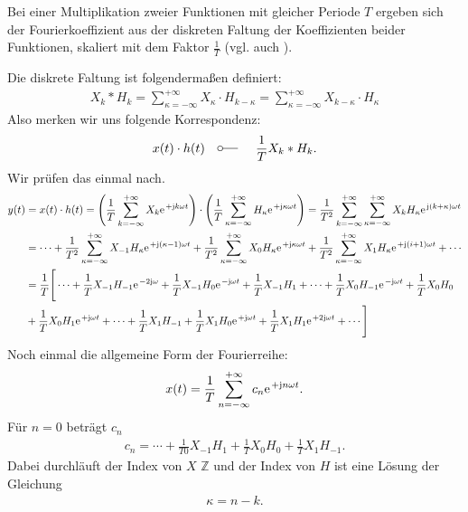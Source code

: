 \documentclass[11pt,a4paper,DIV=12]{scrartcl}
\begin{document}
%
%
%
Bei einer Multiplikation zweier Funktionen mit gleicher Periode $T$ ergeben sich
der Fourierkoeffizient aus der diskreten Faltung der Koeffizienten beider
Funktionen, skaliert mit dem Faktor $\frac{1}{T}$ (vgl. auch \cite[Kap. 3, S. 208]{Oppenheim1997}).

Die diskrete Faltung ist folgendermaßen definiert:
\begin{align}
	X_k\ast H_k=\sum_{\kappa = -\infty}^{+\infty}X_{\kappa}\cdot H_{k-\kappa}=\sum_{\kappa =-\infty}^{+\infty}X_{k-\kappa}\cdot H_{\kappa }
\end{align}
%
Also merken wir uns folgende Korrespondenz:
%
\begin{align}
	x(t)\cdot h(t)\quad\fourier\quad \frac{1}{T}X_k \ast H_k.
\end{align}
%
Wir prüfen das einmal nach.
%
%
\begin{align}
	y(t)&=x(t)\cdot h(t)
	=\left (\frac{1}{T}\sum_{k=-\infty}^{+\infty}X_k\e^{+\im k \omega t}\right )\cdot\left ( \frac{1}{T}\sum_{\kappa=-\infty}^{+\infty}H_{\kappa}\e^{+\im \kappa \omega t}\right )
	=\frac{1}{T^2}\sum_{k=-\infty}^{+\infty}\sum_{\kappa=-\infty}^{+\infty}X_kH_{\kappa}\e^{\im (k+\kappa)\omega t}\nonumber \\
	&=\cdots +\frac{1}{T^2}\sum_{\kappa=-\infty}^{+\infty}X_{-1}H_{\kappa}\e^{+\im(\kappa-1)\omega t}+\frac{1}{T^2}\sum_{\kappa=-\infty}^{+\infty}X_0H_{\kappa}\e^{+\im \kappa \omega t}+\frac{1}{T^2}\sum_{\kappa=-\infty}^{+\infty}X_1H_{\kappa}\e^{+\im(i+1)\omega t}+\cdots\nonumber \\
	&=\frac{1}{T}\Bigg [\cdots+\frac{1}{T}X_{-1}H_{-1}\e^{-2\im \omega }+\frac{1}{T}X_{-1}H_0\e^{-\im \omega t}+\frac{1}{T}X_{-1}H_1+\cdots+\frac{1}{T}X_0H_{-1}\e^{-\im \omega t}+\frac{1}{T}X_0H_0\nonumber\\
	&+\frac{1}{T}X_0H_1\e^{+\im  \omega t}
	+\cdots+\frac{1}{T}X_1H_{-1}+\frac{1}{T}X_1H_0\e^{+\im \omega t}
	+\frac{1}{T}X_1H_1\e^{+2\im \omega t}+\cdots\Bigg]
\end{align}
%
%
Noch einmal die allgemeine Form der Fourierreihe:
%
\begin{align}
	x(t)=\frac{1}{T}\sum_{n=-\infty}^{+\infty}c_n\e^{+\im n \omega t}.
\end{align}
%
Für $n=0$ beträgt $c_n$
%
\begin{align}
	c_n=\cdots + \frac{1}{T0}X_{-1}H_{1}+\frac{1}{T}X_0H_0+\frac{1}{T}X_1H_{-1}.
\end{align}
%
Dabei durchläuft der Index von $X$ $\mathbb{Z}$ und der Index von $H$ ist eine
Lösung der Gleichung
%
\begin{align}
	\kappa = n-k.
\end{align}
\end{document}
